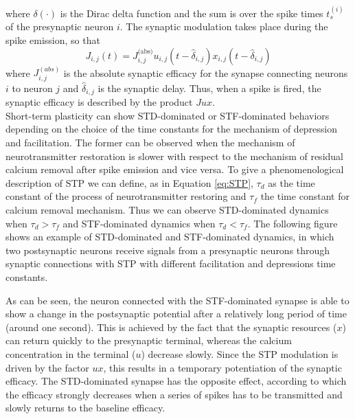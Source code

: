 \documentclass[a4paper, 12pt, twoside, openright]{book}
\begin{document}
where $\delta (\cdot)$ is the Dirac delta function and the sum is over the spike times $t_s^{(i)}$ of the presynaptic neuron $i$. The synaptic modulation takes place during the spike emission, so that
\begin{equation}
    J_{i,j}(t) = J^{\text{(abs)}}_{i,j}u_{i,j}(t-\hat{\delta}_{i,j})x_{i,j}(t-\hat{\delta}_{i,j})
    \label{eq:Jupdate}
\end{equation}
where $J^{(abs)}_{i,j}$ is the absolute synaptic efficacy for the synapse connecting neurons $i$ to neuron $j$ and $\hat{\delta}_{i,j}$ is the synaptic delay. Thus, when a spike is fired, the synaptic efficacy is described by the product $Jux$.\\

Short-term plasticity can show STD-dominated or STF-dominated behaviors depending on the choice of the time constants for the mechanism of depression and facilitation. The former can be observed when the mechanism of neurotransmitter restoration is slower with respect to the mechanism of residual calcium removal after spike emission and vice versa. To give a phenomenological description of STP we can define, as in Equation \eqref{eq:STP}, $\tau_d$ as the time constant of the process of neurotransmitter restoring and $\tau_f$ the time constant for calcium removal mechanism. Thus we can observe STD-dominated dynamics when $\tau_d > \tau_f$ and STF-dominated dynamics when $\tau_d < \tau_f$. The following figure shows an example of STD-dominated and STF-dominated dynamics, in which two postsynaptic neurons receive signals from a presynaptic neurons through synaptic connections with STP with different facilitation and depressions time constants.


As can be seen, the neuron connected with the STF-dominated synapse is able to show a change in the postsynaptic potential after a relatively long period of time (around one second). This is achieved by the fact that the synaptic resources ($x$) can return quickly to the presynaptic terminal, whereas the calcium concentration in the terminal ($u$) decrease slowly. Since the STP modulation is driven by the factor $ux$, this results in a temporary potentiation of the synaptic efficacy. The STD-dominated synapse has the opposite effect, according to which the efficacy strongly decreases when a series of spikes has to be transmitted and slowly returns to the baseline efficacy.
\end{document}
